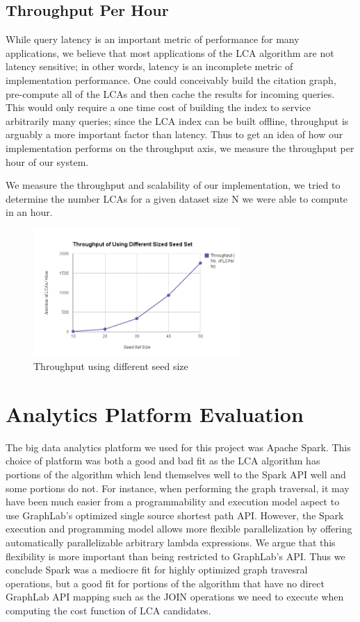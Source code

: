 \documentclass{article}
\begin{document}
\subsection{Throughput Per Hour}

While query latency is an important metric of performance for many applications, we believe that most applications of the LCA algorithm are not latency sensitive; in other words, latency is an incomplete metric of implementation performance.
One could conceivably build the citation graph, pre-compute all of the LCAs and then cache the results for incoming queries.
This would only require a one time cost of building the index to service arbitrarily many queries; since the LCA index can be built offline, throughput is arguably a more important factor than latency.
Thus to get an idea of how our implementation performs on the throughput axis, we measure the throughput per hour of our system.

We measure the throughput and scalability of our implementation, we tried to determine the number LCAs for a given dataset size N we were able to compute in an hour.

\begin{figure}
    \centering
    \includegraphics[width=0.7\textwidth]{throughput.png}
    \caption{Throughput using different seed size}
    \label{fig:throughput}
\end{figure}


\section{Analytics Platform Evaluation}

The big data analytics platform we used for this project was Apache Spark.
This choice of platform was both a good and bad fit as the LCA algorithm has portions of the algorithm which lend themselves well to the Spark API well and some portions do not.
For instance, when performing the graph traversal, it may have been much easier from a programmability and execution model aspect to use GraphLab's optimized single source shortest path API.
However, the Spark execution and programming model allows more flexible parallelization by offering automatically parallelizable arbitrary lambda expressions.
We argue that this flexibility is more important than being restricted to GraphLab's API.
Thus we conclude Spark was a mediocre fit for highly optimized graph travesral operations, but a good fit for portions of the algorithm that have no direct GraphLab API mapping such as the JOIN operations we need to execute when computing the cost function of LCA candidates.
\end{document}
